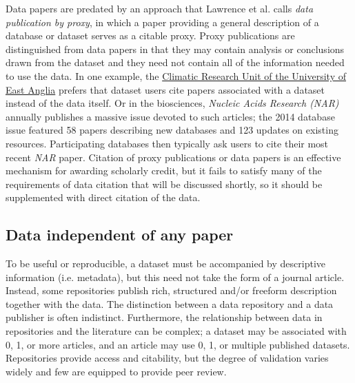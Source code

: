 \documentclass[10pt,a4paper,twocolumn]{article}
\begin{document}
Data papers are predated by an approach that Lawrence et al. calls \emph{data publication by proxy}, in which a paper providing a general description of a database or dataset serves as a citable proxy\cite{lawrence_data_2013}.
Proxy publications are distinguished from data papers in that they may contain analysis or conclusions drawn from the dataset and they need not contain all of the information needed to use the data.
In one example, the \href{http://www.cru.uea.ac.uk/}{Climatic Research Unit of the University of East Anglia} prefers that dataset users cite papers associated with a dataset instead of the data itself.
Or in the biosciences, \emph{Nucleic Acids Research (NAR)} annually publishes a massive issue devoted to such articles; the 2014 database issue featured 58 papers describing new databases and 123 updates on existing resources\cite{fernandez-suarez_2014_2014}.
Participating databases then typically ask users to cite their most recent \emph{NAR} paper.
Citation of proxy publications or data papers is an effective mechanism for awarding scholarly credit, but it fails to satisfy many of the requirements of data citation that will be discussed shortly, so it should be supplemented with direct citation of the data.

\subsection*{Data independent of any paper}\label{paper-independent-data}

To be useful or reproducible, a dataset must be accompanied by descriptive information (i.e. metadata)\cite{gray_online_2002}, but this need not take the form of a journal article.
Instead, some repositories publish rich, structured and/or freeform description together with the data.
The distinction between a data repository and a data publisher is often indistinct.
Furthermore, the relationship between data in repositories and the literature can be complex; a dataset may be associated with 0, 1, or more articles, and an article may use 0, 1, or multiple published datasets.
Repositories provide access and citability, but the degree of validation varies widely and few are equipped to provide peer review.
\end{document}
